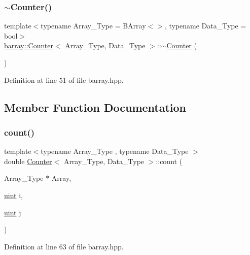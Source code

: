 \subsubsection{\texorpdfstring{$\sim$\+Counter()}{~Counter()}}
{\footnotesize\ttfamily template$<$typename Array\+\_\+\+Type  = B\+Array$<$$>$, typename Data\+\_\+\+Type  = bool$>$ \\
\hyperlink{classbarray_1_1_counter}{barray\+::\+Counter}$<$ Array\+\_\+\+Type, Data\+\_\+\+Type $>$\+::$\sim$\hyperlink{classbarray_1_1_counter}{Counter} (\begin{DoxyParamCaption}{ }\end{DoxyParamCaption})\hspace{0.3cm}{\ttfamily [inline]}}



Definition at line 51 of file barray.\+hpp.



\subsection{Member Function Documentation}
\mbox{\label{classbarray_1_1_counter_afe1d23e72c3bdca9b2481f36ebde1d95}} 
\subsubsection{\texorpdfstring{count()}{count()}}
{\footnotesize\ttfamily template$<$typename Array\+\_\+\+Type , typename Data\+\_\+\+Type $>$ \\
double \hyperlink{classbarray_1_1_counter}{Counter}$<$ Array\+\_\+\+Type, Data\+\_\+\+Type $>$\+::count (\begin{DoxyParamCaption}\item[{Array\+\_\+\+Type $\ast$}]{Array,  }\item[{\hyperlink{namespacebarray_af9756a31953db233f80a9cfe1ef31c32}{uint}}]{i,  }\item[{\hyperlink{namespacebarray_af9756a31953db233f80a9cfe1ef31c32}{uint}}]{j }\end{DoxyParamCaption})\hspace{0.3cm}{\ttfamily [inline]}}



Definition at line 63 of file barray.\+hpp.

\mbox{\label{classbarray_1_1_counter_ae0451979ddc51a5fbf00de78c37d3216}} 
